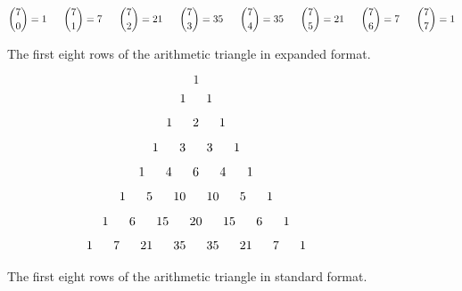 \begin{defn}
\begin{figure}[hbtp]
                $$\binom{7}{0}=1 \hspace{.23in} \binom{7}{1}=7\hspace{.23in} \binom{7}{2}=21 \hspace{.23in} \binom{7}{3}=35\hspace{.23in} \binom{7}{4}=35\hspace{.23in} \binom{7}{5}=21\hspace{.23in} \binom{7}{6}=7\hspace{.23in} \binom{7}{7}=1$$
            \caption{The first eight rows of the  arithmetic triangle in expanded format.}
            \label{figure_arith_tri_expanded}
        \end{figure}

        \begin{figure}
            \centering
                $$1$$
                $$1 \hspace{.23in} 1$$
                $$1 \hspace{.23in} 2 \hspace{.23in} 1$$
                $$1 \hspace{.23in} 3 \hspace{.23in} 3\hspace{.23in} 1$$
                $$1 \hspace{.23in} 4 \hspace{.23in} 6 \hspace{.23in} 4\hspace{.23in}1$$
                $$1 \hspace{.23in} 5 \hspace{.23in} 10 \hspace{.23in} 10\hspace{.23in} 5\hspace{.23in} 1$$
                $$1 \hspace{.23in} 6\hspace{.23in} 15 \hspace{.23in} 20\hspace{.23in}15\hspace{.23in} 6\hspace{.23in} 1$$
                $$1 \hspace{.23in} 7\hspace{.23in} 21 \hspace{.23in} 35\hspace{.23in} 35\hspace{.23in}21\hspace{.23in} 7\hspace{.23in} 1$$
            \caption{The first eight rows of the  arithmetic triangle in standard format.}
            \label{figure_arith_tri_standard}
        \end{figure}
\end{defn} 

